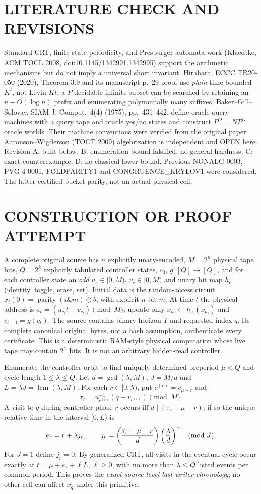 \documentclass[11pt]{article}
\begin{document}
\section{LITERATURE CHECK AND REVISIONS}
Standard CRT, finite-state periodicity, and Presburger-automata work (Klaedtke, ACM TOCL 2008, doi:10.1145/1342991.1342995) support the arithmetic mechanisms but do not imply a universal short invariant. Hirahara, ECCC TR20-050 (2020), Theorem 3.9 and its manuscript p.~29 proof use \emph{plain} time-bounded $K^t$, not Levin $Kt$: a $P$-decidable infinite subset can be searched by retaining an $n-O(\log n)$ prefix and enumerating polynomially many suffixes. Baker--Gill--Solovay, SIAM J. Comput.\ 4(4) (1975), pp.~431--442, define oracle-query machines with a query tape and oracle yes/no states and construct $P^O=NP^O$ oracle worlds. Their machine conventions were verified from the original paper. Aaronson--Wigderson (TOCT 2009) algebrization is independent and OPEN here. Revision A: built below. B: enumeration bound falsified, no general hardness. C: exact counterexample. D: no classical lower bound. Previous NONALG-0003, PVG-4-0001, FOLDPARITY1 and CONGRUENCE_KRYLOV1 were considered. The latter certified bucket parity, not an actual physical cell.

\section{CONSTRUCTION OR PROOF ATTEMPT}
A complete original source has $n$ explicitly unary-encoded, $M=2^n$ physical tape bits, $Q=2^k$ explicitly tabulated controller states, $c_0$, $g:[Q]\to[Q]$, and for each controller state an \emph{odd} $u_c\in[0,M)$, $v_c\in[0,M)$ and unary bit map $h_c$ (identity, toggle, erase, set). Initial data is the random-access circuit $x_i(0)=\operatorname{parity}(i\mathbin{\&}m)\oplus b$, with explicit $n$-bit $m$. At time $t$ the physical address is $a_t=(u_{c_t}t+v_{c_t})\pmod M$; update only $x_{a_t}\leftarrow h_{c_t}(x_{a_t})$ and $c_{t+1}=g(c_t)$. The source contains binary horizon $T$ and requested index $q$. Its complete canonical original bytes, not a hash assumption, authenticate every certificate. This is a deterministic RAM-style physical computation whose live tape may contain $2^n$ bits. It is not an arbitrary hidden-read controller.

Enumerate the controller orbit to find uniquely determined preperiod $\mu<Q$ and cycle length $1\le\lambda\le Q$. Let $d=\gcd(\lambda,M)$, $J=M/d$ and $L=\lambda J=\operatorname{lcm}(\lambda,M)$. For each $r\in[0,\lambda)$, put $c^{(r)}=c_{\mu+r}$ and
\[
\tau_r=u_{c^{(r)}}^{-1}(q-v_{c^{(r)}})\pmod M.
\]
A visit to $q$ during controller phase $r$ occurs iff $d\mid(\tau_r-\mu-r)$; if so the unique relative time in the interval $[0,L)$ is
\[
 e_r=r+\lambda j_r,\qquad
 j_r=\left({\tau_r-\mu-r\over d}\right)
       \left({\lambda\over d}\right)^{-1}\pmod J.
\]
For $J=1$ define $j_r=0$. By generalized CRT, all visits in the eventual cycle occur exactly at $t=\mu+e_r+\ell L$, $\ell\ge0$, with no more than $\lambda\le Q$ listed events per common period. This proves the \emph{exact source-level last-writer chronology}; no other cell can affect $x_q$ under this primitive.
\end{document}
